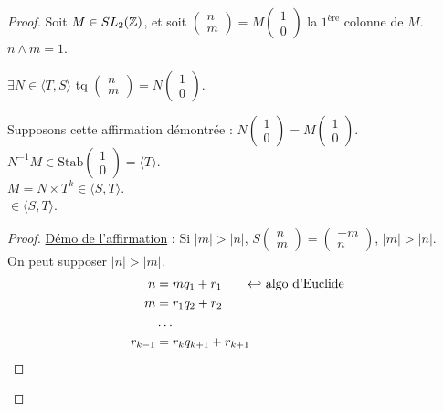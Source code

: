 \begin{proof}
    Soit $M \in SL_2(\mathbb{Z})$, et soit $\begin{pmatrix} n \\ m \end{pmatrix} = M \begin{pmatrix} 1 \\ 0 \end{pmatrix}$ la $1^{\text{ère}}$ colonne de $M$. \\
    $n \wedge m = 1$.

     $\exists N \in \langle T, S \rangle$ tq $\begin{pmatrix} n \\ m \end{pmatrix} = N \begin{pmatrix} 1 \\ 0 \end{pmatrix}$.

    Supposons cette affirmation démontrée : $N \begin{pmatrix} 1 \\ 0 \end{pmatrix} = M \begin{pmatrix} 1 \\ 0 \end{pmatrix}$. \\
    $N^{-1} M \in \text{Stab} \begin{pmatrix} 1 \\ 0 \end{pmatrix} = \langle T \rangle$. \\
    $M = N \times T^k \in \langle S, T \rangle$. \\
    $\in \langle S, T \rangle$.

    \begin{proof}
    \uline{Démo de l'affirmation} : Si $|m| > |n|$, $S \begin{pmatrix} n \\ m \end{pmatrix} = \begin{pmatrix} -m \\ n \end{pmatrix}$, $|m| > |n|$. \\
    On peut supposer $|n| > |m|$.
    \begin{align*}
        n &= m q_1 + r_1 \qquad \text{\reflectbox{$\hookrightarrow$} algo d'Euclide} \\
        m &= r_1 q_2 + r_2 \\
        & \dots \\
        r_{k-1} &= r_k q_{k+1} + r_{k+1}
    \end{align*}


\end{proof}
\end{proof}
